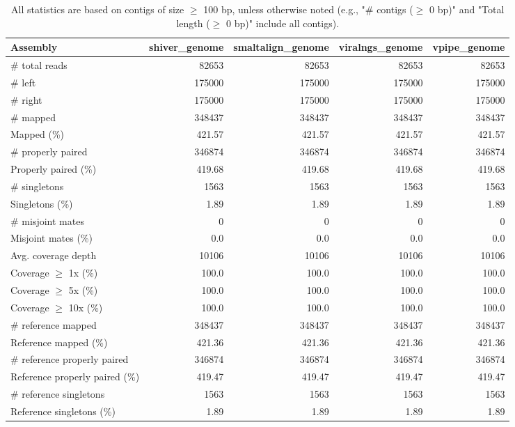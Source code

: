 \documentclass[12pt,a4paper]{article}
\begin{document}
\begin{table}[ht]
\begin{center}
\caption{All statistics are based on contigs of size $\geq$ 100 bp, unless otherwise noted (e.g., "\# contigs ($\geq$ 0 bp)" and "Total length ($\geq$ 0 bp)" include all contigs).}
\begin{tabular}{|l*{4}{|r}|}
\hline
Assembly & shiver\_genome & smaltalign\_genome & viralngs\_genome & vpipe\_genome \\ \hline
\# total reads & 82653 & 82653 & 82653 & 82653 \\ \hline
\# left & 175000 & 175000 & 175000 & 175000 \\ \hline
\# right & 175000 & 175000 & 175000 & 175000 \\ \hline
\# mapped & 348437 & 348437 & 348437 & 348437 \\ \hline
Mapped (\%) & 421.57 & 421.57 & 421.57 & 421.57 \\ \hline
\# properly paired & 346874 & 346874 & 346874 & 346874 \\ \hline
Properly paired (\%) & 419.68 & 419.68 & 419.68 & 419.68 \\ \hline
\# singletons & 1563 & 1563 & 1563 & 1563 \\ \hline
Singletons (\%) & 1.89 & 1.89 & 1.89 & 1.89 \\ \hline
\# misjoint mates & 0 & 0 & 0 & 0 \\ \hline
Misjoint mates (\%) & 0.0 & 0.0 & 0.0 & 0.0 \\ \hline
Avg. coverage depth & 10106 & 10106 & 10106 & 10106 \\ \hline
Coverage $\geq$ 1x (\%) & 100.0 & 100.0 & 100.0 & 100.0 \\ \hline
Coverage $\geq$ 5x (\%) & 100.0 & 100.0 & 100.0 & 100.0 \\ \hline
Coverage $\geq$ 10x (\%) & 100.0 & 100.0 & 100.0 & 100.0 \\ \hline
\# reference mapped & 348437 & 348437 & 348437 & 348437 \\ \hline
Reference mapped (\%) & 421.36 & 421.36 & 421.36 & 421.36 \\ \hline
\# reference properly paired & 346874 & 346874 & 346874 & 346874 \\ \hline
Reference properly paired (\%) & 419.47 & 419.47 & 419.47 & 419.47 \\ \hline
\# reference singletons & 1563 & 1563 & 1563 & 1563 \\ \hline
Reference singletons (\%) & 1.89 & 1.89 & 1.89 & 1.89 \\ \hline

\end{tabular}
\end{center}
\end{table}
\end{document}
